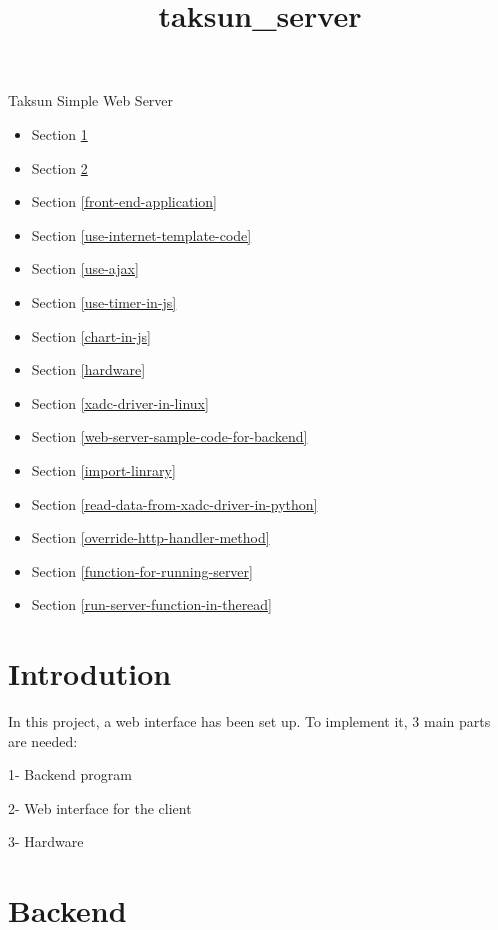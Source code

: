 \documentclass[11pt]{article}
\title{taksun\_server}
\providecommand{\tightlist}{%
      \setlength{\itemsep}{0pt}\setlength{\parskip}{0pt}}
\begin{document}
    
    
    \maketitle
    
    

    
    Taksun Simple Web Server 

    \begin{itemize}
\tightlist
\item
  Section \ref{introdution}
\item
  Section \ref{backend}
\item
  Section \ref{front-end-application}
\item
  Section \ref{use-internet-template-code}
\item
  Section \ref{use-ajax}
\item
  Section \ref{use-timer-in-js}
\item
  Section \ref{chart-in-js}
\item
  Section \ref{hardware}
\item
  Section \ref{xadc-driver-in-linux}
\item
  Section \ref{web-server-sample-code-for-backend}
\item
  Section \ref{import-linrary}
\item
  Section \ref{read-data-from-xadc-driver-in-python}
\item
  Section \ref{override-http-handler-method}
\item
  Section \ref{function-for-running-server}
\item
  Section \ref{run-server-function-in-theread}
\end{itemize}

    \section{Introdution}\label{introdution}

In this project, a web interface has been set up. To implement it, 3
main parts are needed:

1- Backend program

2- Web interface for the client

3- Hardware

    \section{Backend}\label{backend}
\end{document}
